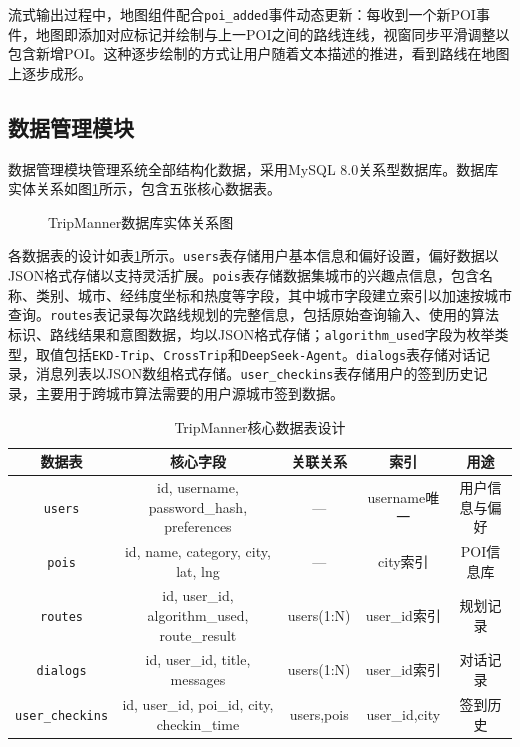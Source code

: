流式输出过程中，地图组件配合\texttt{poi\_added}事件动态更新：每收到一个新POI事件，地图即添加对应标记并绘制与上一POI之间的路线连线，视窗同步平滑调整以包含新增POI。这种逐步绘制的方式让用户随着文本描述的推进，看到路线在地图上逐步成形。

\subsection{数据管理模块}
\label{sec:ch5_data}

数据管理模块管理系统全部结构化数据，采用MySQL 8.0关系型数据库。数据库实体关系如图\ref{fig:ch5_er}所示，包含五张核心数据表。

\begin{figure}[hbt]
  \centering
  \caption{TripManner数据库实体关系图}
  \label{fig:ch5_er}
\end{figure}

各数据表的设计如表\ref{tab:ch5_db}所示。\texttt{users}表存储用户基本信息和偏好设置，偏好数据以JSON格式存储以支持灵活扩展。\texttt{pois}表存储数据集城市的兴趣点信息，包含名称、类别、城市、经纬度坐标和热度等字段，其中城市字段建立索引以加速按城市查询。\texttt{routes}表记录每次路线规划的完整信息，包括原始查询输入、使用的算法标识、路线结果和意图数据，均以JSON格式存储；\texttt{algorithm\_used}字段为枚举类型，取值包括\texttt{EKD-Trip}、\texttt{CrossTrip}和\texttt{DeepSeek-Agent}。\texttt{dialogs}表存储对话记录，消息列表以JSON数组格式存储。\texttt{user\_checkins}表存储用户的签到历史记录，主要用于跨城市算法需要的用户源城市签到数据。

\begin{table}[hbt]
  \centering
  \caption{TripManner核心数据表设计}
  \label{tab:ch5_db}
  \begin{tabular*}{0.95\textwidth}{@{\extracolsep{\fill}}ccccc}
  \toprule
    数据表 & 核心字段 & 关联关系 & 索引 & 用途 \\
  \midrule
    \texttt{users} & id, username, password\_hash, preferences & --- & username唯一 & 用户信息与偏好 \\
    \texttt{pois} & id, name, category, city, lat, lng & --- & city索引 & POI信息库 \\
    \texttt{routes} & id, user\_id, algorithm\_used, route\_result & users(1:N) & user\_id索引 & 规划记录 \\
    \texttt{dialogs} & id, user\_id, title, messages & users(1:N) & user\_id索引 & 对话记录 \\
    \texttt{user\_checkins} & id, user\_id, poi\_id, city, checkin\_time & users,pois & user\_id,city & 签到历史 \\
  \bottomrule
  \end{tabular*}
\end{table}

